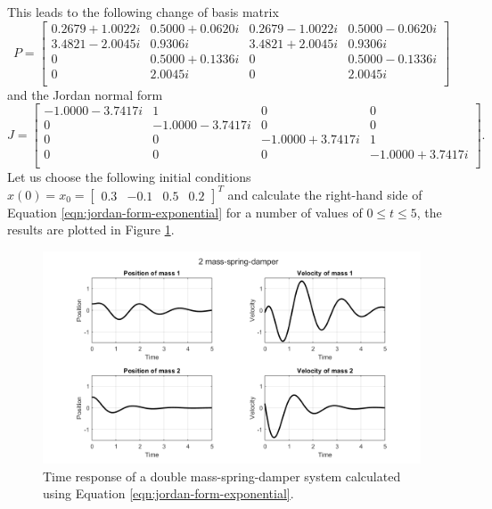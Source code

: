 \begin{example}
\begin{table}[ht]
        \label{tab:eigen-example-system}
    \end{table}
    This leads to the following change of basis matrix
    \begin{equation*}
        P = 
        \begin{bmatrix}
            0.2679 + 1.0022i & 0.5000 + 0.0620i &  0.2679 - 1.0022i &  0.5000 - 0.0620i \\
            3.4821 - 2.0045i  & 0.9306i &  3.4821 + 2.0045i & 0.9306i \\
            0&  0.5000 + 0.1336i  & 0  &  0.5000 - 0.1336i \\
            0 &  2.0045i &  0 & 2.0045i \\
        \end{bmatrix}
    \end{equation*}
    and the Jordan normal form
    \begin{equation*}
        J =
        \begin{bmatrix}
            -1.0000 - 3.7417i &  1 &  0 &   0 \\
            0 & -1.0000 - 3.7417i &  0 &  0 \\
            0 &  0 & -1.0000 + 3.7417i  & 1 \\
            0 &  0 &  0 & -1.0000 + 3.7417i \\
        \end{bmatrix}.
    \end{equation*}
    Let us choose the following initial conditions $x(0)=x_0=\begin{bmatrix}
        0.3 & -0.1 & 0.5 & 0.2 
    \end{bmatrix}^T$ and calculate the right-hand side of Equation \eqref{eqn:jordan-form-exponential} for a number of values of $0\leq t \leq 5$, the results are plotted in Figure \ref{fig:system-response}.
    \begin{figure}[ht]
        \centering
        \includegraphics[width=0.9\linewidth]{report/Figures/system-response.png}
        \caption{Time response of a double mass-spring-damper system calculated using Equation \eqref{eqn:jordan-form-exponential}.}
        \label{fig:system-response}
    \end{figure}
\end{example}


